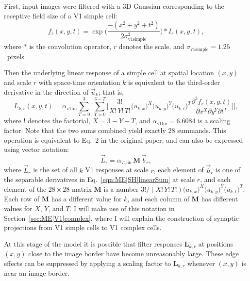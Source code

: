 First, input images were filtered with a 3D Gaussian corresponding
to the receptive field size of a \ac{V1} simple cell:
\begin{equation}
f_r(x,y,t) = \exp\bigg(
	\frac{-(x^2+y^2+t^2)}{2\sigma^2_{\textrm{v1simple}}}\bigg)
    * I_r(x,y,t),
\label{eqn:ME|SH|filter}
\end{equation}
where $*$ is the convolution operator, $r$ denotes the scale, and
$\sigma_{\textrm{v1simple}} = 1.25$~pixels.

Then the underlying linear response of a simple cell at
spatial location $(x,y)$ and scale $r$ with space-time orientation
$k$ is equivalent to the third-order derivative in the direction of
$\vec{u}_k$; that is,
\begin{equation}
L_{k,r}(x,y,t) = \alpha_{\mathrm{v1lin}} \sum_{T=0}^3 \Bigg[
	\sum_{Y=0}^{3-T} \bigg[ \frac{3!}{X!\, Y!\, T!} 
    \Big( u_{k,x} \Big)^X
    \Big( u_{k,y} \Big)^Y
    \Big( u_{k,t} \Big)^T
    \frac{\partial^3 f_r(x,y,t)}{\partial x^X \partial y^Y
    	\partial t^T}
    \bigg] \Bigg],
\label{eqn:ME|SH|linearSum}
\end{equation}
where $!$ denotes the factorial, $X=3-Y-T$, and
$\alpha_{\textrm{v1lin}} = 6.6084$ is
a scaling factor. Note that the two sums combined yield
exactly $28$ summands. This operation is equivalent to Eq.~$2$
in the original paper, and can also be expressed using vector
notation:
\begin{equation}
\vec{L}_r = \alpha_{\textrm{v1lin}}\, \textbf{M}\, \vec{b}_r,
\label{eqn:ME|SH|linearMatrix}
\end{equation}
where $\vec{L}_r$ is the set of all $k$ V1 responses at scale $r$,
each element of $\vec{b}_r$ is one of the separable
derivatives in Eq.~\ref{eqn:ME|SH|linearSum} at scale $r$,
and each element of the $28\times28$ matrix $\textbf{M}$
is a number
$3!/(X!\, Y!\, T!) \big(u_{k,x}\big)^X
	\big(u_{k,y}\big)^Y
    \big(u_{k,t}\big)^T$.
Each row of $\textbf{M}$ has a different value for $k$,
and each column of $\textbf{M}$ has different
values for $X$, $Y$, and $T$.
I will make use of this notation in Section~\ref{sec:ME|V1|complex}, where I
will explain the construction of synaptic projections from \ac{V1} simple cells
to \ac{V1} complex cells.

At this stage of the model it is possible that filter responses
$\mathbf{L}_{k,r}$ at positions $(x,y)$ close to the image border 
have become unreasonably large.
These edge effects can be suppressed by applying a scaling factor
to $\mathbf{L}_{k,r}$ whenever $(x,y)$ is near an image border.

